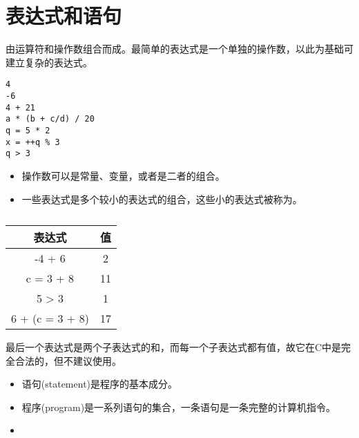 \section{表达式和语句}

\begin{frame}[fragile]
\begin{dingyi}
  由运算符和操作数组合而成。最简单的表达式是一个单独的操作数，以此为基础可建立复杂的表达式。
\end{dingyi}
\begin{lstlisting}[frame=no]
4
-6
4 + 21
a * (b + c/d) / 20
q = 5 * 2
x = ++q % 3
q > 3
\end{lstlisting}
\end{frame}

\begin{frame}[fragile]
\begin{itemize}
\item 操作数可以是常量、变量，或者是二者的组合。\\[0.15in]
\item 一些表达式是多个较小的表达式的组合，这些小的表达式被称为。
\end{itemize}
\end{frame}

\begin{frame}[fragile]

\begin{table}
\centering
\caption{}
\begin{tabular}{c|c} \hline
表达式 & 值 \\ \hline \hline
-4 + 6 & 2\\\hline
c = 3 + 8 & 11 \\ \hline
5 > 3 & 1 \\ \hline
6 + (c = 3 + 8) & 17 \\ \hline
\end{tabular}
\end{table}

最后一个表达式是两个子表达式的和，而每一个子表达式都有值，故它在C中是完全合法的，但不建议使用。

\end{frame}

\begin{frame}[fragile]
\begin{itemize}
\item 
  语句(statement)是程序的基本成分。\\[0.15in]
\item
  程序(program)是一系列语句的集合，一条语句是一条完整的计算机指令。\\[0.15in]
\item
{}
\end{itemize}

\end{frame}


